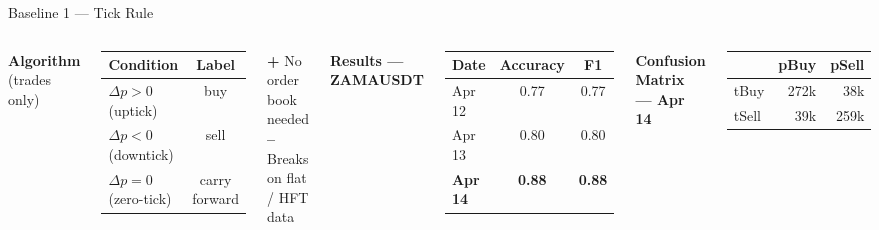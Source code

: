 \documentclass[aspectratio=169,10pt]{beamer}
\begin{document}
\begin{frame}{Baseline 1 — Tick Rule}
  \begin{columns}[T]
    \textbf{Algorithm} (trades only)
    \begin{center}
    \begin{tabular}{lc}
      \toprule
      Condition & Label \\
      \midrule
      $\Delta p > 0$ (uptick)   & buy \\
      $\Delta p < 0$ (downtick) & sell \\
      $\Delta p = 0$ (zero-tick)& carry forward \\
      \bottomrule
    \end{tabular}
    \end{center}
    \medskip
    \textcolor{okgreen}{\textbf{+}} No order book needed\\
    \textcolor{badred}{\textbf{--}} Breaks on flat / HFT data

    \textbf{Results — ZAMAUSDT}
    \begin{center}
    \begin{tabular}{lcc}
      \toprule
      Date & Accuracy & F1 \\
      \midrule
      Apr 12 & 0.77 & 0.77 \\
      Apr 13 & 0.80 & 0.80 \\
      \textbf{Apr 14} & \textbf{0.88} & \textbf{0.88} \\
      \bottomrule
    \end{tabular}
    \end{center}
    \medskip
    \textbf{Confusion Matrix — Apr 14}
    \begin{center}
    \small
    \begin{tabular}{lrr}
      \toprule
       & pBuy & pSell \\
      \midrule
      tBuy  & 272k & 38k \\
      tSell & 39k  & 259k \\
      \bottomrule
    \end{tabular}
    \end{center}
  \end{columns}
\end{frame}
\end{document}
